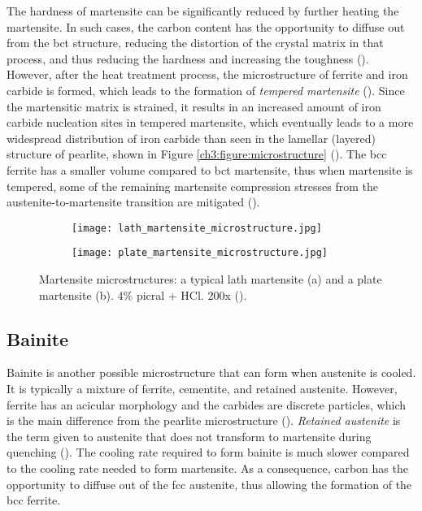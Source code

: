 The hardness of martensite can be significantly reduced by further heating the martensite. In such cases, the carbon content has the opportunity to diffuse out from the bct structure, reducing the distortion of the crystal matrix in that process, and thus reducing the hardness and increasing the toughness (\cite{bhadeshia2017steels}). However, after the heat treatment process, the microstructure of ferrite and iron carbide is formed, which leads to the formation of \emph{tempered martensite} (\cite{bajaj2020steels}). Since the martensitic matrix is strained, it results in an increased amount of iron carbide nucleation sites in tempered martensite, which eventually leads to a more widespread distribution of iron carbide than seen in the lamellar (layered) structure of pearlite, shown in Figure \ref{ch3:figure:microstructure} (\cite{bajaj2020steels}). The bcc ferrite has a smaller volume compared to bct martensite, thus when martensite is tempered, some of the remaining martensite compression stresses from the austenite-to-martensite transition are mitigated (\cite{molabe2018determining}).

\begin{figure}[H]
\centering

\begin{subfigure}{.45\textwidth}
    \centering
    \texttt{[image: lath\_martensite\_microstructure.jpg]}
    \caption{}
\end{subfigure}
\begin{subfigure}{.45\textwidth}
    \centering
    \texttt{[image: plate\_martensite\_microstructure.jpg]}
    \caption{}
\end{subfigure}

\caption{Martensite microstructures: a typical lath martensite (a) and a plate martensite (b). 4\% picral + HCl. 200x (\cite{molabe2018determining}).}
\label{ch3:figure:martensite:microstructures}
\end{figure}

\subsection{Bainite}
Bainite is another possible microstructure that can form when austenite is cooled. It is typically a mixture of ferrite, cementite, and retained austenite. However, ferrite has an acicular morphology and the carbides are discrete particles, which is the main difference from the pearlite microstructure (\cite{molabe2018determining}). \emph{Retained austenite} is the term given to austenite that does not transform to martensite during quenching (\cite{bajaj2020steels}). The cooling rate required to form bainite is much slower compared to the cooling rate needed to form martensite. As a consequence, carbon has the opportunity to diffuse out of the fcc austenite, thus allowing the formation of the \acrshort{bcc} ferrite.

